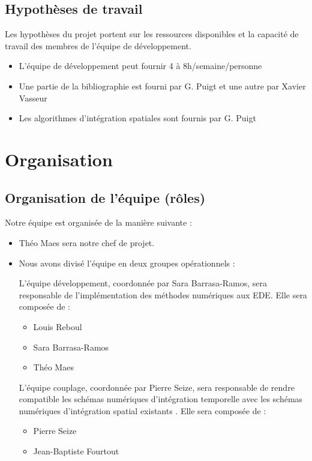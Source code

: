 \documentclass[a4paper,12pt]{report}
\theoremstyle{break}
\begin{document}
\section{Hypothèses de travail}
    Les hypothèses du projet portent sur les ressources disponibles et la capacité de travail des membres de l’équipe de développement.
   \begin{itemize}[label=\textbullet]
   	\item L’équipe de développement peut fournir 4 à 8h/semaine/personne
   	\item Une partie de la bibliographie est fourni par G. Puigt et une autre par Xavier Vasseur
   	\item  Les algorithmes d’intégration spatiales sont fournis par G. Puigt
    \end{itemize}


\chapter{Organisation}
\section{Organisation de l’équipe (rôles)}
    Notre équipe est organisée de la manière suivante :
   \begin{itemize}[label=\textbullet]
   	\item Théo Maes sera notre chef de projet. 
   	\item {Nous avons divisé l’équipe en deux groupes opérationnels :
   	
   	    L’équipe développement, coordonnée par Sara Barrasa-Ramos, sera responsable de l'implémentation des méthodes numériques aux EDE. Elle sera composée de :
   	    \begin{itemize}[label=\textbullet]
   	    \item Louis Reboul
   	    \item Sara Barrasa-Ramos
   	    \item Théo Maes
        \end{itemize}
        
        L’équipe couplage, coordonnée par Pierre Seize, sera responsable de rendre compatible les schémas numériques d'intégration temporelle avec les schémas numériques d'intégration spatial existants . Elle sera composée de :
   	    \begin{itemize}[label=\textbullet]
   	    \item Pierre Seize
   	    \item Jean-Baptiste Fourtout
        \end{itemize}
        }
    \end{itemize}
\end{document}
